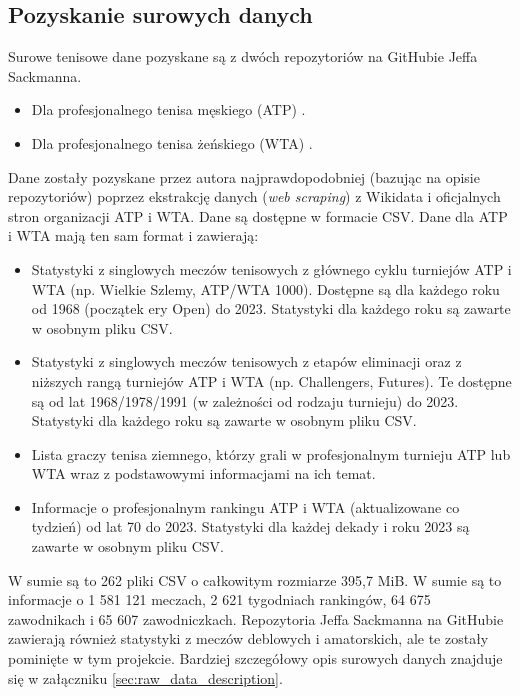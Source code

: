 \documentclass[12pt, a4paper]{article}
\begin{document}
\subsection{Pozyskanie surowych danych} \label{sec:obtain_raw_data}
Surowe tenisowe dane pozyskane są z dwóch repozytoriów na GitHubie Jeffa Sackmanna.
\begin{itemize}
    \item Dla profesjonalnego tenisa męskiego (ATP) \cite{tennis_atp}.
    \item Dla profesjonalnego tenisa żeńskiego (WTA) \cite{tennis_wta}.
\end{itemize}
Dane zostały pozyskane przez autora najprawdopodobniej (bazując na opisie repozytoriów) poprzez ekstrakcję danych (\textit{web scraping}) z Wikidata i oficjalnych stron organizacji ATP i WTA. Dane są dostępne w formacie CSV. Dane dla ATP i WTA mają ten sam format i zawierają:
\begin{itemize}
    \item Statystyki z singlowych meczów tenisowych z głównego cyklu turniejów ATP i WTA (np. Wielkie Szlemy, ATP/WTA 1000). Dostępne są dla każdego roku od 1968 (początek ery Open) do 2023. Statystyki dla każdego roku są zawarte w osobnym pliku CSV.
    \item Statystyki z singlowych meczów tenisowych z etapów eliminacji oraz z niższych rangą turniejów ATP i WTA (np. Challengers, Futures). Te dostępne są od lat 1968/1978/1991 (w zależności od rodzaju turnieju) do 2023. Statystyki dla każdego roku są zawarte w osobnym pliku CSV.
    \item Lista graczy tenisa ziemnego, którzy grali w profesjonalnym turnieju ATP lub WTA wraz z podstawowymi informacjami na ich temat.
    \item Informacje o profesjonalnym rankingu ATP i WTA (aktualizowane co tydzień) od lat 70 do 2023. Statystyki dla każdej dekady i roku 2023 są zawarte w osobnym pliku CSV.
\end{itemize}
W sumie są to 262 pliki CSV o całkowitym rozmiarze 395,7 MiB. W sumie są to informacje o 1 581 121 meczach, 2 621 tygodniach rankingów, 64 675 zawodnikach i 65 607 zawodniczkach. Repozytoria Jeffa Sackmanna na GitHubie zawierają również statystyki z meczów deblowych i amatorskich, ale te zostały pominięte w tym projekcie. Bardziej szczegółowy opis surowych danych znajduje się w załączniku \ref{sec:raw_data_description}.
\end{document}
